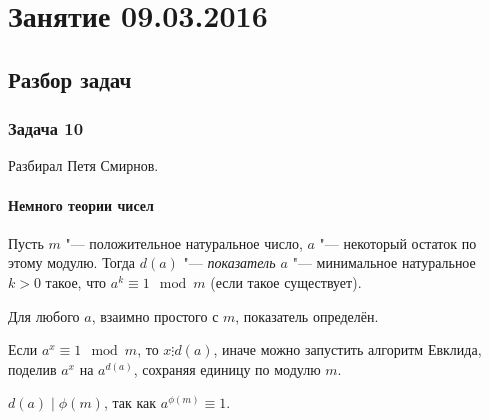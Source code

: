 \chapter{Занятие 09.03.2016}

\section{Разбор задач}
\subsection{Задача 10}
	Разбирал Петя Смирнов.

	\subsubsection{Немного теории чисел}
		\begin{Def}
			Пусть $m$ "--- положительное натуральное число, $a$ "--- некоторый остаток по этому модулю.
			Тогда $d(a)$ "--- \textit{показатель $a$} "--- минимальное натуральное $k>0$ такое,
			что $a^k \equiv 1 \mod m$ (если такое существует).
		\end{Def}
		\begin{Rem}
			Для любого $a$, взаимно простого с $m$, показатель определён.
		\end{Rem}
		\begin{Rem}
			Если $a^x \equiv 1 \mod m$, то $x \vdots d(a)$, иначе можно запустить
			алгоритм Евклида, поделив $a^x$ на $a^{d(a)}$, сохраняя единицу по модулю $m$.
		\end{Rem}
		\begin{conseq}
			$d(a)\mid\phi(m)$, так как $a^{\phi(m)} \equiv 1$.
		\end{conseq}

